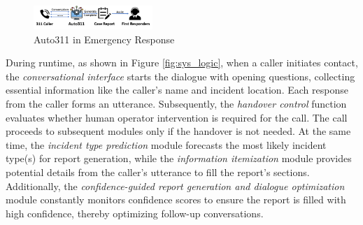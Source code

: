 \begin{figure}[h]
    \centering
    \includegraphics[width=0.4\textwidth]{figures/system_overview.png}
    \caption{Auto311 in Emergency Response}
    \label{fig:sys_overview}
    \vspace{-0.5cm}
\end{figure}

During runtime, as shown in Figure \ref{fig:sys_logic}, when a caller initiates contact, the \textit{conversational interface} starts the dialogue with opening questions, collecting essential information like the caller's name and incident location. Each response from the caller forms an utterance. Subsequently, the \textit{handover control} function evaluates whether human operator intervention is required for the call. The call proceeds to subsequent modules only if the handover is not needed. At the same time, the \textit{incident type prediction} module forecasts the most likely incident type(s) for report generation, while the \textit{information itemization} module provides potential details from the caller's utterance to fill the report's sections. Additionally, the \textit{confidence-guided report generation and dialogue optimization} module constantly monitors confidence scores to ensure the report is filled with high confidence, thereby optimizing follow-up conversations.


